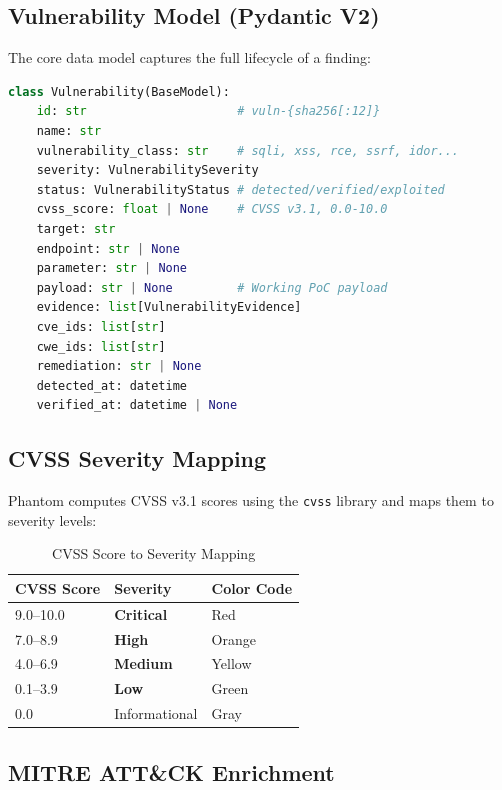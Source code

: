 \documentclass[12pt,a4paper]{article}
\begin{document}
\subsection{Vulnerability Model (Pydantic V2)}

The core data model captures the full lifecycle of a finding:

\begin{lstlisting}[language=Python, caption={Vulnerability Pydantic model (abbreviated)}]
class Vulnerability(BaseModel):
    id: str                     # vuln-{sha256[:12]}
    name: str
    vulnerability_class: str    # sqli, xss, rce, ssrf, idor...
    severity: VulnerabilitySeverity
    status: VulnerabilityStatus # detected/verified/exploited
    cvss_score: float | None    # CVSS v3.1, 0.0-10.0
    target: str
    endpoint: str | None
    parameter: str | None
    payload: str | None         # Working PoC payload
    evidence: list[VulnerabilityEvidence]
    cve_ids: list[str]
    cwe_ids: list[str]
    remediation: str | None
    detected_at: datetime
    verified_at: datetime | None
\end{lstlisting}

\subsection{CVSS Severity Mapping}

Phantom computes CVSS v3.1 scores using the \texttt{cvss} library and maps them to severity levels:

\begin{table}[H]
\centering
\caption{CVSS Score to Severity Mapping}
\begin{tabular}{lll}
\toprule
\textbf{CVSS Score} & \textbf{Severity} & \textbf{Color Code} \\
\midrule
9.0--10.0 & \textcolor{criticalred}{\textbf{Critical}} & Red \\
7.0--8.9 & \textcolor{highorange}{\textbf{High}} & Orange \\
4.0--6.9 & \textcolor{mediumyellow}{\textbf{Medium}} & Yellow \\
0.1--3.9 & \textcolor{lowgreen}{\textbf{Low}} & Green \\
0.0 & Informational & Gray \\
\bottomrule
\end{tabular}
\end{table}

\subsection{MITRE ATT\&CK Enrichment}
\end{document}
